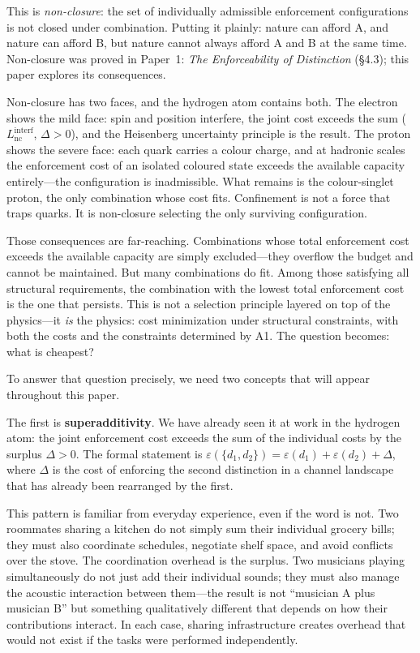 \documentclass[11pt]{article}
\begin{document}
This is \emph{non-closure}: the set of individually admissible enforcement configurations is not closed under combination.  Putting it plainly: nature can afford A, and nature can afford B, but nature cannot always afford A and B at the same time.  Non-closure was proved in Paper~1: \emph{The Enforceability of Distinction} (\S4.3); this paper explores its consequences.

Non-closure has two faces, and the hydrogen atom contains both.  The electron shows the mild face: spin and position interfere, the joint cost exceeds the sum ($L_{\mathrm{nc}}^{\mathrm{interf}}$, $\Delta > 0$), and the Heisenberg uncertainty principle is the result.  The proton shows the severe face: each quark carries a colour charge, and at hadronic scales the enforcement cost of an isolated coloured state exceeds the available capacity entirely---the configuration is inadmissible.  What remains is the colour-singlet proton, the only combination whose cost fits.  Confinement is not a force that traps quarks.  It is non-closure selecting the only surviving configuration.

Those consequences are far-reaching.  Combinations whose total enforcement cost exceeds the available capacity are simply excluded---they overflow the budget and cannot be maintained.  But many combinations do fit.  Among those satisfying all structural requirements, the combination with the lowest total enforcement cost is the one that persists.  This is not a selection principle layered on top of the physics---it \emph{is} the physics: cost minimization under structural constraints, with both the costs and the constraints determined by A1.  The question becomes: what is cheapest?

To answer that question precisely, we need two concepts that will appear throughout this paper.

The first is \textbf{superadditivity}.  We have already seen it at work in the hydrogen atom: the joint enforcement cost exceeds the sum of the individual costs by the surplus $\Delta > 0$.  The formal statement is $\varepsilon(\{d_1, d_2\}) = \varepsilon(d_1) + \varepsilon(d_2) + \Delta$, where $\Delta$ is the cost of enforcing the second distinction in a channel landscape that has already been rearranged by the first.

This pattern is familiar from everyday experience, even if the word is not.  Two roommates sharing a kitchen do not simply sum their individual grocery bills; they must also coordinate schedules, negotiate shelf space, and avoid conflicts over the stove.  The coordination overhead is the surplus.  Two musicians playing simultaneously do not just add their individual sounds; they must also manage the acoustic interaction between them---the result is not ``musician A plus musician B'' but something qualitatively different that depends on how their contributions interact.  In each case, sharing infrastructure creates overhead that would not exist if the tasks were performed independently.
\end{document}
